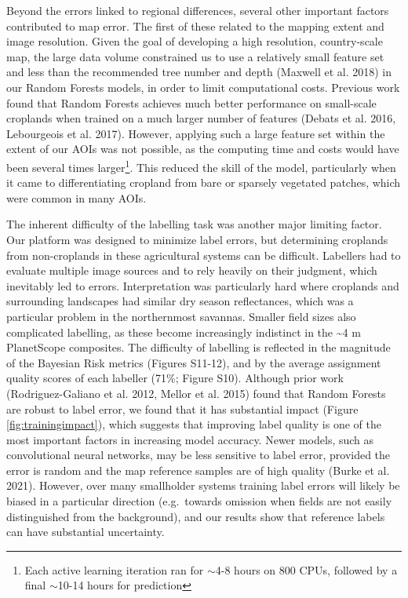 \documentclass[11pt,a4paper]{article}
\begin{document}
Beyond the errors linked to regional differences, several other
important factors contributed to map error. The first of these related
to the mapping extent and image resolution. Given the goal of developing
a high resolution, country-scale map, the large data volume constrained
us to use a relatively small feature set and less than the recommended
tree number and depth (Maxwell et al. 2018) in our Random Forests
models, in order to limit computational costs. Previous work found that
Random Forests achieves much better performance on small-scale croplands
when trained on a much larger number of features (Debats et al. 2016,
Lebourgeois et al. 2017). However, applying such a large feature set
within the extent of our AOIs was not possible, as the computing time
and costs would have been several times
larger\footnote{Each active learning iteration ran for $\sim$4-8 hours on 800 CPUs, followed by a final $\sim$10-14 hours for prediction}.
This reduced the skill of the model, particularly when it came to
differentiating cropland from bare or sparsely vegetated patches, which
were common in many AOIs.

The inherent difficulty of the labelling task was another major limiting
factor. Our platform was designed to minimize label errors, but
determining croplands from non-croplands in these agricultural systems
can be difficult. Labellers had to evaluate multiple image sources and
to rely heavily on their judgment, which inevitably led to errors.
Interpretation was particularly hard where croplands and surrounding
landscapes had similar dry season reflectances, which was a particular
problem in the northernmost savannas. Smaller field sizes also
complicated labelling, as these become increasingly indistinct in the
\textasciitilde4 m PlanetScope composites. The difficulty of labelling
is reflected in the magnitude of the Bayesian Risk metrics (Figures
S11-12), and by the average assignment quality scores of each labeller
(71\%; Figure S10). Although prior work (Rodriguez-Galiano et al. 2012,
Mellor et al. 2015) found that Random Forests are robust to label error,
we found that it has substantial impact (Figure
\ref{fig:trainingimpact}), which suggests that improving label quality
is one of the most important factors in increasing model accuracy. Newer
models, such as convolutional neural networks, may be less sensitive to
label error, provided the error is random and the map reference samples
are of high quality (Burke et al. 2021). However, over many smallholder
systems training label errors will likely be biased in a particular
direction (e.g.~towards omission when fields are not easily
distinguished from the background), and our results show that reference
labels can have substantial uncertainty.
\end{document}
